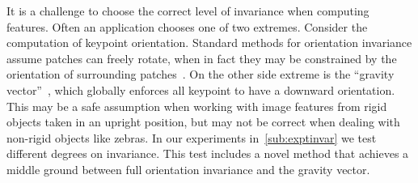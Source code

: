         It is a challenge to choose the correct level of invariance
          when computing features.
        Often an application chooses one of two extremes.
        Consider the computation of keypoint orientation.
        Standard methods for orientation invariance assume patches can
          freely rotate, when in fact they may be constrained by the
          orientation of surrounding
          patches~\cite{lowe_distinctive_2004}.
        On the other side extreme is the ``gravity
          vector''~\cite{perdoch_efficient_2009}, which globally enforces
          all keypoint to have a downward orientation.
        This may be a safe assumption when working with image features
          from rigid objects taken in an upright position, but may not be
          correct when dealing with non-rigid objects like zebras.
        In our experiments in~\cref{sub:exptinvar} we test different
          degrees on invariance.
        This test includes a novel method that achieves a middle ground
          between full orientation invariance and the gravity vector.

